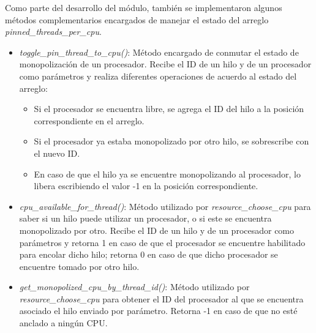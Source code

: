 Como parte del desarrollo del módulo, también se implementaron algunos métodos complementarios encargados de manejar el estado del arreglo \textit{pinned\_threads\_per\_cpu}.

\begin{itemize}
    \item \textit{toggle\_pin\_thread\_to\_cpu()}: Método encargado de conmutar el estado de monopolización de un procesador. Recibe el ID de un hilo y de un procesador como parámetros y realiza diferentes operaciones de acuerdo al estado del arreglo:
    \begin{itemize}
        \item Si el procesador se encuentra libre, se agrega el ID del hilo a la posición correspondiente en el arreglo.
        \item Si el procesador ya estaba monopolizado por otro hilo, se sobrescribe con el nuevo ID.
        \item En caso de que el hilo ya se encuentre monopolizando al procesador, lo libera escribiendo el valor -1 en la posición correspondiente.
    \end{itemize}
    \item \textit{cpu\_available\_for\_thread()}: Método utilizado por \textit{resource\_choose\_cpu} para saber si un hilo puede utilizar un procesador, o si este se encuentra monopolizado por otro. Recibe el ID de un hilo y de un procesador como parámetros y retorna 1 en caso de que el procesador se encuentre habilitado para encolar dicho hilo; retorna 0 en caso de que dicho procesador se encuentre tomado por otro hilo.
    \item \textit{get\_monopolized\_cpu\_by\_thread\_id()}: Método utilizado por \textit{resource\_choose\_cpu} para obtener el ID del procesador al que se encuentra asociado el hilo enviado por parámetro. Retorna -1 en caso de que no esté anclado a ningún CPU.
\end{itemize}



